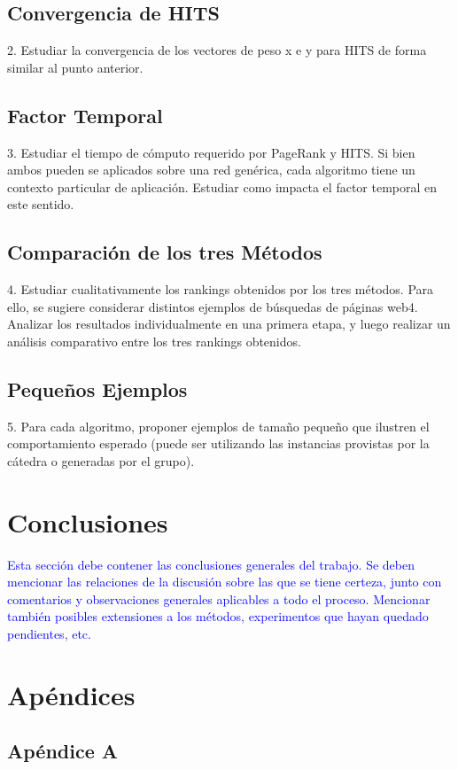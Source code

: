 \documentclass[a4paper]{article}
\begin{document}
\subsection{Convergencia de HITS}
2. Estudiar la convergencia de los vectores de peso x e y para HITS de forma similar al
punto anterior.

\subsection{Factor Temporal}
3. Estudiar el tiempo de c\'omputo requerido por PageRank y HITS. Si bien ambos pueden
se aplicados sobre una red gen\'erica, cada algoritmo tiene un contexto particular de
aplicaci\'on. Estudiar como impacta el factor temporal en este sentido.

\subsection{Comparaci\'on de los tres M\'etodos}
4. Estudiar cualitativamente los rankings obtenidos por los tres m\'etodos. Para ello, se sugiere
considerar distintos ejemplos de b\'usquedas de p\'aginas web4. Analizar los resultados
individualmente en una primera etapa, y luego realizar un an\'alisis comparativo entre
los tres rankings obtenidos.

\subsection{Peque\~nos Ejemplos}
5. Para cada algoritmo, proponer ejemplos de tama\~no peque\~no que ilustren el comportamiento
esperado (puede ser utilizando las instancias provistas por la c\'atedra o generadas
por el grupo).
\newpage
\section{Conclusiones}
\textcolor{blue}{Esta secci\'on debe contener las conclusiones generales del trabajo. Se deben mencionar
las relaciones de la discusi\'on sobre las que se tiene certeza, junto con comentarios
y observaciones generales aplicables a todo el proceso. Mencionar tambi\'en posibles
extensiones a los m\'etodos, experimentos que hayan quedado pendientes, etc.
}
\\
\newpage
\section{Ap\'endices}
	\subsection{Ap\'endice A}
%		
\newpage
\end{document}
